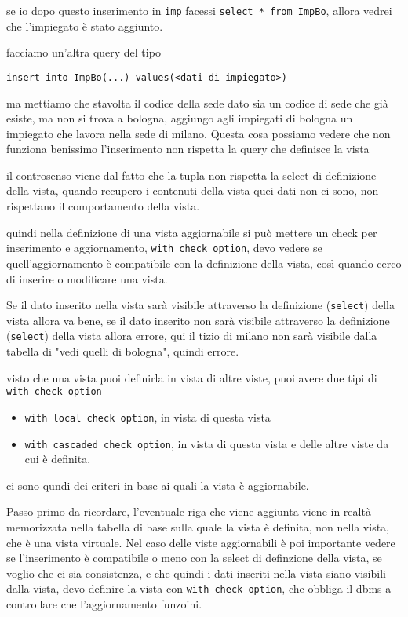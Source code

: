 \documentclass[11pt]{article}
\begin{document}
se io dopo questo inserimento in \texttt{imp} facessi \texttt{select * from ImpBo}, allora vedrei che
l'impiegato è stato aggiunto.

facciamo un'altra query del tipo
\begin{verbatim}
insert into ImpBo(...) values(<dati di impiegato>)
\end{verbatim}

ma mettiamo che stavolta il codice della sede dato sia un codice di sede che già esiste,
ma non si trova a bologna, aggiungo agli impiegati di bologna un impiegato che lavora
nella sede di milano.
Questa cosa possiamo vedere che non funziona benissimo
l'inserimento non rispetta la query che definisce la vista

il controsenso viene dal fatto che la tupla non rispetta la select di definizione della
vista, quando recupero i contenuti della vista quei dati non ci sono, non rispettano il
comportamento della vista.

quindi nella definizione di una vista aggiornabile si può mettere un check per inserimento
e aggiornamento, \texttt{with check option}, devo vedere se quell'aggiornamento è compatibile con
la definizione della vista, così quando cerco di inserire o modificare una vista.

Se il dato inserito nella vista sarà visibile attraverso la definizione (\texttt{select}) della
vista allora va bene, se il dato inserito non sarà visibile attraverso la definizione
(\texttt{select}) della vista allora errore, qui il tizio di milano non sarà visibile dalla
tabella di "vedi quelli di bologna", quindi errore.

visto che una vista puoi definirla in vista di altre viste, puoi avere due tipi di \texttt{with
check option} 
\begin{itemize}
\item \texttt{with local check option}, in vista di questa vista
\item \texttt{with cascaded check option}, in vista di questa vista e delle altre viste da cui è
definita.
\end{itemize}

ci sono qundi dei criteri in base ai quali la vista è aggiornabile.

Passo primo da ricordare, l'eventuale riga che viene aggiunta viene in realtà memorizzata
nella tabella di base sulla quale la vista è definita, non nella vista, che è una vista
virtuale.
Nel caso delle viste aggiornabili è poi importante vedere se l'inserimento è compatibile o
meno con la select di definzione della vista, se voglio che ci sia consistenza, e che
quindi i dati inseriti nella vista siano visibili dalla vista, devo definire la vista con
\texttt{with check option}, che obbliga il dbms a controllare che l'aggiornamento funzoini.
\end{document}
